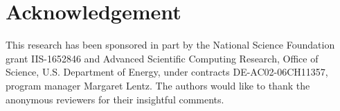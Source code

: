 \section*{Acknowledgement}
This research has been sponsored in part by the National Science Foundation grant IIS-1652846 and Advanced Scientific Computing Research, Office of Science, U.S. Department of Energy, under contracts DE-AC02-06CH11357, program manager Margaret Lentz. The authors would like to thank the anonymous reviewers for their insightful comments.